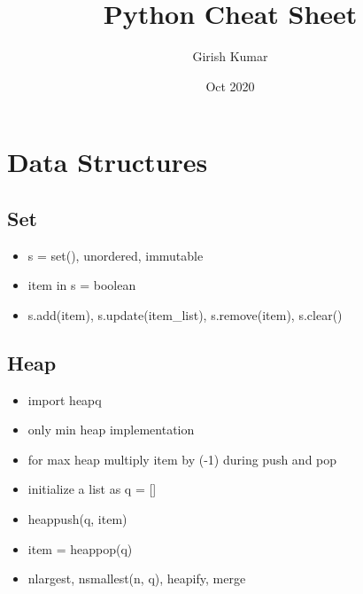 \documentclass{article}
\title{Python Cheat Sheet}
\author{Girish Kumar }
\date{Oct 2020}
\newcommand{\hrfullline}{\noindent\makebox[\linewidth]{\rule{\paperwidth}{2pt}}}
\begin{document}
\maketitle

\setcounter{secnumdepth}{0}
\tableofcontents

\newpage
\section{Data Structures}

\subsection{Set}
\begin{itemize}
    \item s = set(), unordered, immutable
    \item item in s = boolean
    \item s.add(item), s.update(item\_list), s.remove(item), s.clear()
\end{itemize}

\subsection{Heap}
\begin{itemize}
    \item import heapq
    \item only min heap implementation
    \item for max heap multiply item by (-1) during push and pop
    \item initialize a list  as q = []
    \item heappush(q, item)
    \item item = heappop(q)
    \item nlargest, nsmallest(n, q), heapify, merge
\end{itemize}

\hrfullline
\end{document}

